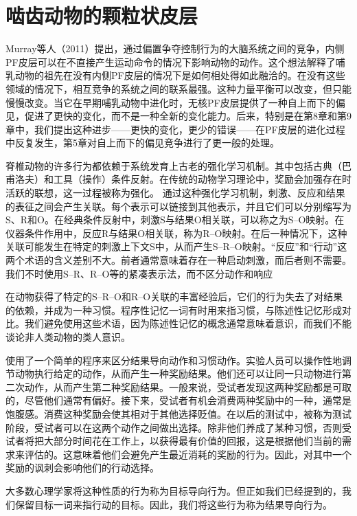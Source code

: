 \section{啮齿动物的颗粒状皮层}
Murray等人（2011）提出，通过偏置争夺控制行为的大脑系统之间的竞争，内侧PF皮层可以在不直接产生运动命令的情况下影响动物的动作。这个想法解释了哺乳动物的祖先在没有内侧PF皮层的情况下是如何相处得如此融洽的。在没有这些领域的情况下，相互竞争的系统之间的联系最强。这种力量平衡可以改变，但只能慢慢改变。当它在早期哺乳动物中进化时，无核PF皮层提供了一种自上而下的偏见，促进了更快的变化，而不是一种全新的变化能力。后来，特别是在第8章和第9章中，我们提出这种进步——更快的变化，更少的错误——在PF皮层的进化过程中反复发生，第5章对自上而下的偏见竞争进行了更一般的处理。\par
脊椎动物的许多行为都依赖于系统发育上古老的强化学习机制。其中包括古典（巴甫洛夫）和工具（操作）条件反射\cite{Dickinson 1980}。在传统的动物学习理论中，奖励会加强存在时活跃的联想，这一过程被称为强化。
通过这种强化学习机制，刺激、反应和结果的表征之间会产生关联。每个表示可以链接到其他表示，并且它们可以分别缩写为S、R和O。在经典条件反射中，刺激S与结果O相关联，可以称之为S–O映射。在仪器条件作用中，反应R与结果O相关联，称为R–O映射。在后一种情况下，这种关联可能发生在特定的刺激上下文S中，从而产生S–R–O映射。“反应”和“行动”这两个术语的含义差别不大。前者通常意味着存在一种启动刺激，而后者则不需要。我们不时使用S–R、R–O等的紧凑表示法，而不区分动作和响应\par
在动物获得了特定的S–R–O和R–O关联的丰富经验后，它们的行为失去了对结果的依赖，并成为一种习惯。程序性记忆一词有时用来指习惯，与陈述性记忆形成对比。我们避免使用这些术语，因为陈述性记忆的概念通常意味着意识，而我们不能谈论非人类动物的类人意识。\par
\cite{Balleine et al.2003}使用了一个简单的程序来区分结果导向动作和习惯动作。实验人员可以操作性地调节动物执行给定的动作，从而产生一种奖励结果。他们还可以让同一只动物进行第二次动作，从而产生第二种奖励结果。一般来说，受试者发现这两种奖励都是可取的，尽管他们通常有偏好。接下来，受试者有机会消费两种奖励中的一种，通常是饱腹感。消费这种奖励会使其相对于其他选择贬值。在以后的测试中，被称为测试阶段，受试者可以在这两个动作之间做出选择。除非他们养成了某种习惯，否则受试者将把大部分时间花在工作上，以获得最有价值的回报，这是根据他们当前的需求来评估的。这意味着他们会避免产生最近消耗的奖励的行为。因此，对其中一个奖励的讽刺会影响他们的行动选择。\par
大多数心理学家将这种性质的行为称为目标导向行为。但正如我们已经提到的，我们保留目标一词来指行动的目标。因此，我们将这些行为称为结果导向行为。\par
